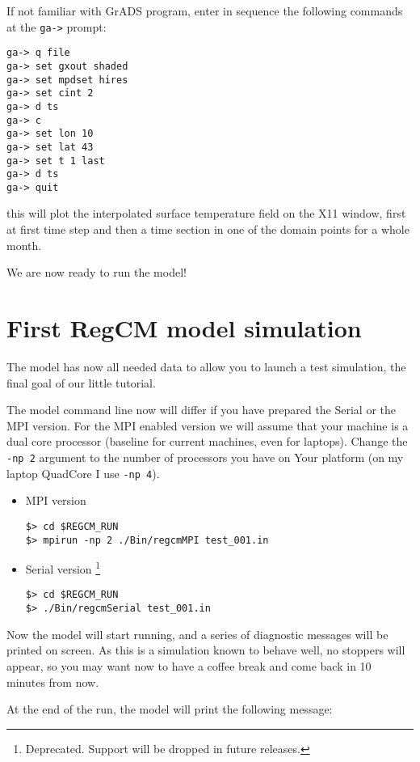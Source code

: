 If not familiar with GrADS program, enter in sequence the following commands at
the \verb=ga->= prompt:

\begin{Verbatim}
ga-> q file
ga-> set gxout shaded
ga-> set mpdset hires
ga-> set cint 2
ga-> d ts
ga-> c
ga-> set lon 10
ga-> set lat 43
ga-> set t 1 last
ga-> d ts
ga-> quit
\end{Verbatim}

this will plot the interpolated surface temperature field on the X11 window,
first at first time step and then a time section in one of the domain points
for a whole month.

We are now ready to run the model!

\section{First RegCM model simulation}

The model has now all needed data to allow you to launch a test simulation,
the final goal of our little tutorial.

The model command line now will differ if you have prepared the Serial or the
MPI version. For the MPI enabled version we will assume that your machine is
a dual core processor (baseline for current machines, even for laptops).
Change the \verb=-np 2= argument to the number of processors you have on
Your platform (on my laptop QuadCore I use \verb=-np 4=).

\begin{itemize}
\item MPI version
\begin{Verbatim}
$> cd $REGCM_RUN
$> mpirun -np 2 ./Bin/regcmMPI test_001.in
\end{Verbatim}
\item Serial version \footnote{Deprecated. Support will be dropped in future
releases.}
\begin{Verbatim}
$> cd $REGCM_RUN
$> ./Bin/regcmSerial test_001.in
\end{Verbatim}
\end{itemize}

Now the model will start running, and a series of diagnostic messages will be
printed on screen. As this is a simulation known to behave well, no stoppers
will appear, so you may want now to have a coffee break and come back in 10
minutes from now.

At the end of the run, the model will print the following message:

